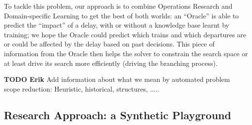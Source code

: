 \documentclass{article}
\begin{document}
To tackle this problem, our approach is to combine Operations Research and Domain-specific Learning to get the best of both worlds: an ``Oracle'' is able to predict the ``impact'' of a delay, with or without a knowledge base learnt by training; we hope the Oracle could predict which trains and which departures are or could be affected by the delay based on past decisions. This piece of information from the Oracle then helps the solver to constrain the search space or at least drive its search more efficiently (driving the branching process).


\begin{mdframed}
{\bf TODO Erik}  Add information about what we mean by automated problem scope reduction: Heuristic, historical, structures, .....

\end{mdframed}

\subsection{Research Approach: a Synthetic Playground}\label{subsec:playground}
\end{document}
